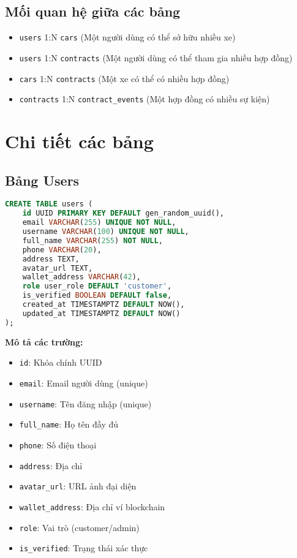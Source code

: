 \documentclass[12pt,a4paper]{article}
\begin{document}
\subsection{Mối quan hệ giữa các bảng}
\begin{itemize}
    \item \texttt{users} 1:N \texttt{cars} (Một người dùng có thể sở hữu nhiều xe)
    \item \texttt{users} 1:N \texttt{contracts} (Một người dùng có thể tham gia nhiều hợp đồng)
    \item \texttt{cars} 1:N \texttt{contracts} (Một xe có thể có nhiều hợp đồng)
    \item \texttt{contracts} 1:N \texttt{contract\_events} (Một hợp đồng có nhiều sự kiện)
\end{itemize}

\section{Chi tiết các bảng}

\subsection{Bảng Users}
\begin{lstlisting}[language=SQL, caption=Cấu trúc bảng users]
CREATE TABLE users (
    id UUID PRIMARY KEY DEFAULT gen_random_uuid(),
    email VARCHAR(255) UNIQUE NOT NULL,
    username VARCHAR(100) UNIQUE NOT NULL,
    full_name VARCHAR(255) NOT NULL,
    phone VARCHAR(20),
    address TEXT,
    avatar_url TEXT,
    wallet_address VARCHAR(42),
    role user_role DEFAULT 'customer',
    is_verified BOOLEAN DEFAULT false,
    created_at TIMESTAMPTZ DEFAULT NOW(),
    updated_at TIMESTAMPTZ DEFAULT NOW()
);
\end{lstlisting}

\textbf{Mô tả các trường:}
\begin{itemize}
    \item \texttt{id}: Khóa chính UUID
    \item \texttt{email}: Email người dùng (unique)
    \item \texttt{username}: Tên đăng nhập (unique)
    \item \texttt{full\_name}: Họ tên đầy đủ
    \item \texttt{phone}: Số điện thoại
    \item \texttt{address}: Địa chỉ
    \item \texttt{avatar\_url}: URL ảnh đại diện
    \item \texttt{wallet\_address}: Địa chỉ ví blockchain
    \item \texttt{role}: Vai trò (customer/admin)
    \item \texttt{is\_verified}: Trạng thái xác thực
\end{itemize}
\end{document}
